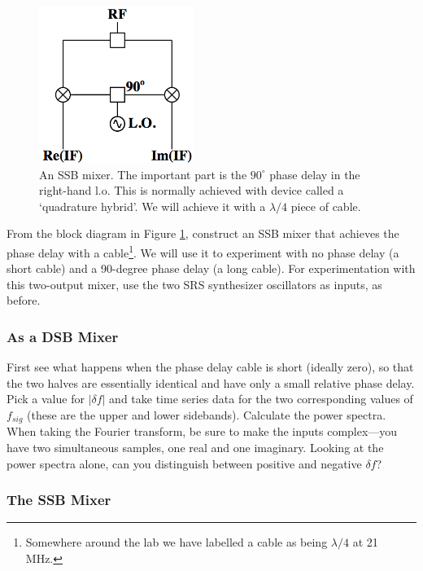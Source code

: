 \documentclass[12pt,preprint]{aastex}
\begin{document}
\begin{figure}[h!]
\begin{center}
  \includegraphics[height=2in]{ssbmixer.png}
\end{center}
\caption{\footnotesize An SSB mixer. The important part is the
  $90^\circ$ phase delay in the right-hand l.o. This is normally
  achieved with device called a `quadrature hybrid'. We will achieve it
  with a $\lambda/4$ piece of cable. \label{ssb}}
\end{figure}

From the block diagram in Figure \ref{ssb}, construct an SSB mixer that
achieves the phase delay with a cable\footnote{Somewhere around the lab
  we have labelled a cable as being $\lambda/4$ at 21 MHz.}. We will use
it to experiment with no phase delay (a short cable) and a 90-degree
phase delay (a long cable).  For experimentation with this two-output
mixer, use the two SRS synthesizer oscillators as inputs, as before.

\subsubsection{As a DSB Mixer} \label{dsbmixer}

First see what happens when the phase delay cable is short (ideally
zero), so that the two halves are essentially identical and have only a
small relative phase delay. Pick a value for $|\delta f|$ and take time
series data for the two corresponding values of $f_{sig}$ (these are the
upper and lower sidebands). Calculate the power spectra. When taking the
Fourier transform, be sure to make the inputs complex---you have two
simultaneous samples, one real and one imaginary. Looking at the power
spectra alone, can you distinguish between positive and negative $\delta
f$?

\subsubsection{The SSB Mixer}
\end{document}

